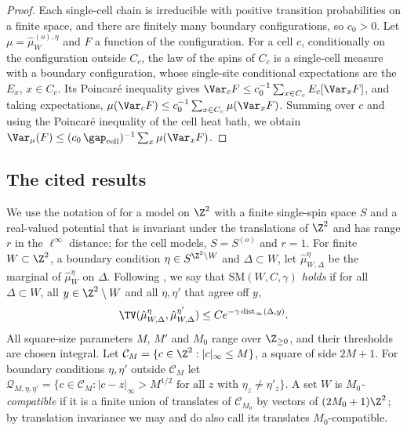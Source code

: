 \begin{proof}
Each single-cell chain is irreducible with positive transition probabilities on a finite space, and there are finitely many boundary configurations, so $c_0 > 0$. Let $\mu = \hat\mu^{(o), \eta}_W$ and $F$ a function of the configuration. For a cell $c$, conditionally on the configuration outside $C_c$, the law of the spins of $C_c$ is a single-cell measure with a boundary configuration, whose single-site conditional expectations are the $E_x$, $x \in C_c$. Its Poincar\'e inequality gives $\Var_c F \le c_0^{-1} \sum_{x \in C_c} E_c [\Var_x F]$, and taking expectations, $\mu(\Var_c F) \le c_0^{-1} \sum_{x \in C_c} \mu(\Var_x F)$. Summing over $c$ and using the Poincar\'e inequality of the cell heat bath, we obtain $\Var_\mu(F) \le (c_0 \, \gap_{\mathrm{cell}})^{-1} \sum_{x} \mu(\Var_x F)$.
\end{proof}

\subsection{The cited results}\label{s:cited}

We use the notation of \cite{MOS94} for a model on $\Z^2$ with a finite single-spin space $S$ and a real-valued potential that is invariant under the translations of $\Z^2$ and has range $r$ in the $\ell^\infty$ distance; for the cell models, $S = S^{(o)}$ and $r = 1$. For finite $W \subset \Z^2$, a boundary condition $\eta \in S^{\Z^2 \setminus W}$ and $\Delta \subset W$, let $\hat\mu^\eta_{W, \Delta}$ be the marginal of $\hat\mu^\eta_W$ on $\Delta$. Following \cite[(1.10)]{MOS94}, we say that \emph{$\mathrm{SM}(W, C, \gamma)$ holds} if for all $\Delta \subset W$, all $y \in \Z^2 \setminus W$ and all $\eta, \eta'$ that agree off $y$,
\begin{equation}\label{e:SM}
\TV(\hat\mu^\eta_{W, \Delta}, \hat\mu^{\eta'}_{W, \Delta}) \le C e^{-\gamma \operatorname{dist}_\infty(\Delta, y)} .
\end{equation}
All square-size parameters $M$, $M'$ and $M_0$ range over $\Z_{\ge0}$, and their thresholds are chosen integral. Let $\mathcal C_M = \{ c \in \Z^2 : |c|_\infty \le M\}$, a square of side $2M + 1$. For boundary conditions $\eta, \eta'$ outside $\mathcal C_M$ let $\mathcal Q_{M, \eta, \eta'} = \{ c \in \mathcal C_M : |c - z|_\infty > M^{1/2} \text{ for all } z \text{ with } \eta_z \neq \eta'_z \}$. A set $W$ is \emph{$M_0$-compatible} if it is a finite union of translates of $\mathcal C_{M_0}$ by vectors of $(2 M_0 + 1) \Z^2$; by translation invariance we may and do also call its translates $M_0$-compatible.

